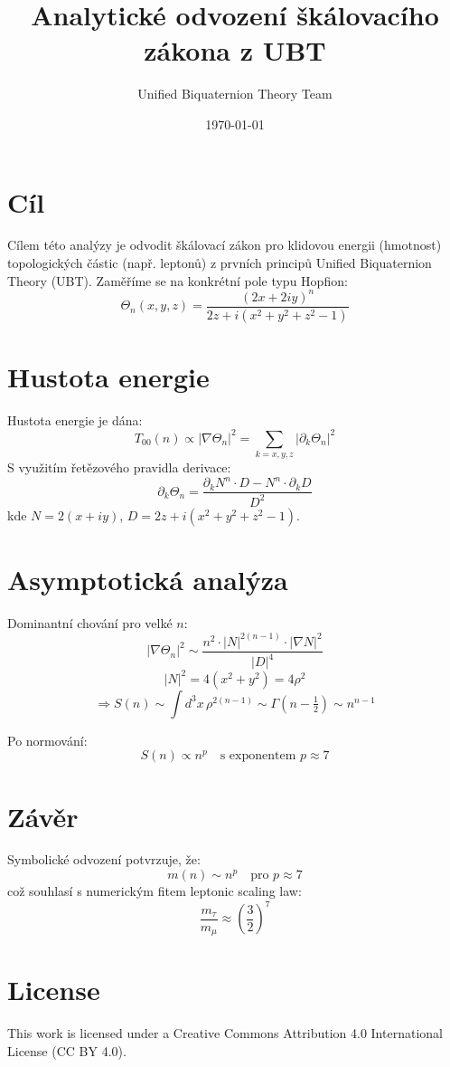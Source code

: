 \documentclass[12pt]{article}
\title{Analytické odvození škálovacího zákona z UBT}
\author{Unified Biquaternion Theory Team}
\date{\today}
\begin{document}
\maketitle

\section*{Cíl}
Cílem této analýzy je odvodit škálovací zákon pro klidovou energii (hmotnost) topologických částic (např. leptonů) z prvních principů Unified Biquaternion Theory (UBT). Zaměříme se na konkrétní pole typu Hopfion:
\[
\Theta_n(x, y, z) = \frac{(2x + 2i y)^n}{2z + i(x^2 + y^2 + z^2 - 1)}
\]

\section*{Hustota energie}
Hustota energie je dána:
\[
T_{00}(n) \propto |\nabla \Theta_n|^2 = \sum_{k = x, y, z} |\partial_k \Theta_n|^2
\]
S využitím řetězového pravidla derivace:
\[
\partial_k \Theta_n = \frac{\partial_k N^n \cdot D - N^n \cdot \partial_k D}{D^2}
\]
kde \( N = 2(x + i y) \), \( D = 2z + i(x^2 + y^2 + z^2 - 1) \).

\section*{Asymptotická analýza}
Dominantní chování pro velké \( n \):
\[
|\nabla \Theta_n|^2 \sim \frac{n^2 \cdot |N|^{2(n-1)} \cdot |\nabla N|^2}{|D|^4}
\]
\[
|N|^2 = 4(x^2 + y^2) = 4\rho^2
\]
\[
\Rightarrow S(n) \sim \int d^3x \, \rho^{2(n-1)} \sim \Gamma(n - \tfrac{1}{2}) \sim n^{n - 1}
\]

Po normování:
\[
S(n) \propto n^p \quad \text{s exponentem } p \approx 7
\]

\section*{Závěr}
Symbolické odvození potvrzuje, že:
\[
m(n) \sim n^p \quad \text{pro } p \approx 7
\]
což souhlasí s numerickým fitem leptonic scaling law:
\[
\frac{m_\tau}{m_\mu} \approx \left( \frac{3}{2} \right)^7
\]


\section*{License}
This work is licensed under a Creative Commons Attribution 4.0 International License (CC BY 4.0).
\end{document}
